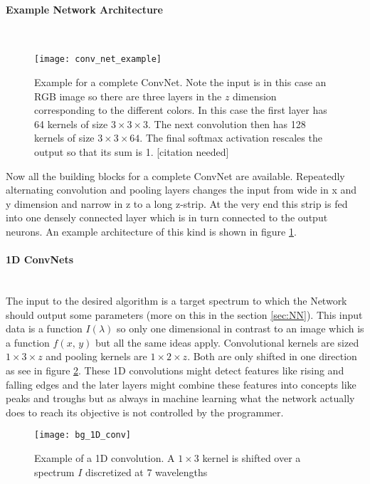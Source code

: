 \paragraph{Example Network Architecture}~\\
\begin{figure}[H]
    \centering
    \texttt{[image: conv\_net\_example]}
    \caption{Example for a complete ConvNet. Note the input is in this case an RGB image so there are three layers in the $z$ dimension corresponding to the different colors. In this case the first layer has 64 kernels of size $3 \times 3 \times 3$. The next convolution then has 128 kernels of size $3 \times 3 \times 64$. The final softmax activation rescales the output so that its sum is 1. [citation needed]}
    \label{fig:bg:NN_example}
\end{figure}

Now all the building blocks for a complete ConvNet are available. Repeatedly alternating convolution and pooling layers changes the input from wide in x and y dimension and narrow in z to a long z-strip. At the very end this strip is fed into one densely connected layer which is in turn connected to the output neurons. An example architecture of this kind is shown in figure \ref{fig:bg:NN_example}.



\paragraph{1D ConvNets}~\\
The input to the desired algorithm is a target spectrum to which the Network should output some parameters (more on this in the section \ref{sec:NN}). This input data is a function $I(\lambda)$ so only one dimensional in contrast to an image which is a function $f(x, \, y)$ but all the same ideas apply. Convolutional kernels are sized $1 \times 3 \times z$ and pooling kernels are $1 \times 2 \times z$. Both are  only shifted in one direction as see in figure \ref{fig:bg:1D_conv}. These 1D convolutions might detect features like rising and falling edges and the later layers might combine these features into concepts like peaks and troughs but as always in machine learning what the network actually does to reach its objective is not controlled by the programmer.

\begin{figure}[H]
    \centering
    \texttt{[image: bg\_1D\_conv]}
    \caption{Example of a 1D convolution. A $1 \times 3$ kernel is shifted over a spectrum $I$ discretized at 7 wavelengths}
    \label{fig:bg:1D_conv}
\end{figure}
\vspace{1.5cm}


